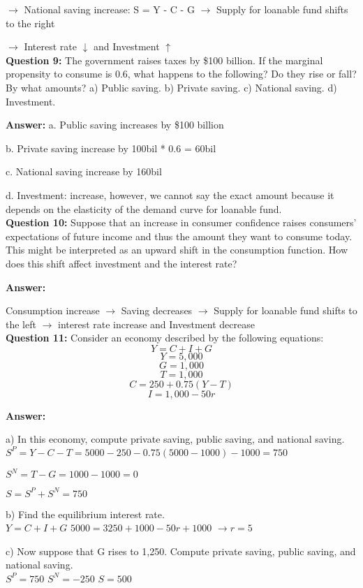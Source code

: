 \documentclass[a4paper, 11pt]{article}
\begin{document}
$\rightarrow$ National saving increase: S = Y - C - G $\rightarrow$ Supply for loanable fund shifts to the right

$\rightarrow$ Interest rate $\downarrow$ and Investment $\uparrow$
\\

\textbf{Question 9:} The government raises taxes by \$100 billion. If the marginal propensity to consume is 0.6, what happens to the following? Do they rise or fall? By what amounts?
a) Public saving.
b) Private saving.
c) National saving.
d) Investment.

\textbf{Answer:} 
a. Public saving increases by \$100 billion

b. Private saving increase by 100bil * 0.6 = 60bil

c. National saving increase by 160bil

d. Investment: increase, however, we cannot say the exact amount because it depends on the elasticity of the demand curve for loanable fund. \\


\textbf{Question 10:} Suppose that an increase in consumer confidence raises consumers’ expectations of future income and thus the amount they want to consume today. This might be interpreted as an upward shift in the consumption function. How does this shift affect investment and the interest rate?

\textbf{Answer:} 

Consumption increase $\rightarrow$ Saving decreases $\rightarrow$ Supply for loanable fund shifts to the left $\rightarrow$ interest rate increase and Investment decrease
 \\

\textbf{Question 11:} Consider an economy described by the following equations:
$$Y=C+I+G$$
$$Y=5,000$$
$$G=1,000$$
$$T=1,000$$
$$C=250 +0.75(Y −T)$$
$$I=1,000 −50r$$

\textbf{Answer:} 

a) In this economy, compute private saving, public saving, and national saving. \\
$S^{P} = Y - C - T = 5000 - 250 - 0.75(5000 - 1000) - 1000 = 750$

$S^{N} = T - G = 1000 - 1000 = 0$

$S = S^{P} + S^{N} = 750$

b) Find the equilibrium interest rate. \\
$Y = C + I + G$
$5000 = 3250 + 1000 - 50r + 1000$
$\rightarrow r = 5$

c) Now suppose that G rises to 1,250. Compute private saving, public saving, and national saving.\\
$S^{P} = 750$
$S^{N} = -250$
$S = 500$
\end{document}
